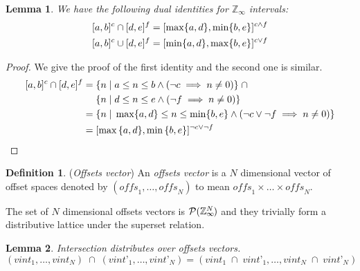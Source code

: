 \documentclass{article}
\theoremstyle{definition}
\newtheorem{defn}{Definition}
\theoremstyle{plain}
\newtheorem{lem}{Lemma}
\newcommand{\zinf}{\textnormal{$\mathbb{Z}_\infty$}}
\newcommand{\interv}[3]{\textnormal{$\lbrack#1,#2\rbrack^{#3}$}}
\begin{document}
\begin{lem}{}
  We have the following dual identities for \zinf{} intervals:
%
  \begin{align*}
    \interv{a}{b}{c} \cap \interv{d}{e}{f} & =
      \interv{\max \{a,d\}}{\min \{b,e\}}{c \wedge f} \\
    \interv{a}{b}{c} \cup \interv{d}{e}{f} & =
      \interv{\min \{a,d\}}{\max \{b,e\}}{c \vee f}
  \end{align*}\label{lem:zinf-identities}
\end{lem}
%
\begin{proof}
  We give the proof of the first identity and the second one is similar.
  \begin{align*}
    \interv{a}{b}{c} \cap \interv{d}{e}{f} = &
      \; \{ n \;|\; a \leq n \leq b \wedge (\neg c \implies n \neq 0) \}
      \;\cap \\
      & \; \{ n \;|\; d \leq n \leq e \wedge (\neg f \implies n \neq 0) \}
      \\
    = & \; \{ n \;|\; \max \{a,d\} \leq n \leq \min \{b,e\} \wedge (\neg c
      \vee \neg f \implies n \neq 0) \} \\
    = & \; \interv{\max{\{a,d\}}}{\min{\{b,e\}}}{\neg c \vee \neg f}
  \end{align*}
\end{proof}

\begin{defn}{(\emph{Offsets vector})}
  An \emph{offsets vector} is a $N$ dimensional vector of offset spaces denoted
  by $(\textit{offs}_1, \dots, \textit{offs}_N)$ to mean $\textit{offs}_1 \times
  \dots \times \textit{offs}_N$.

  The set of $N$ dimensional offsets vectors is
  $\mathcal{P}{(\zinf{}^{\mkern-19mu{N}})}$ and they trivially form a
  distributive lattice under the superset relation.
\end{defn}

\begin{lem}{}
  Intersection distributes over offsets vectors.
%
  \begin{equation*}
    (\textit{vint}_1, \dots, \textit{vint}_N) \;\cap\;
      (\textit{vint'}_1, \dots, \textit{vint'}_N)
      =
    (\textit{vint}_1 \;\cap\; \textit{vint'}_1, \dots,
     \textit{vint}_N \;\cap\; \textit{vint'}_N)
  \end{equation*}\label{lem:vector-intersect}
\end{lem}
\end{document}
